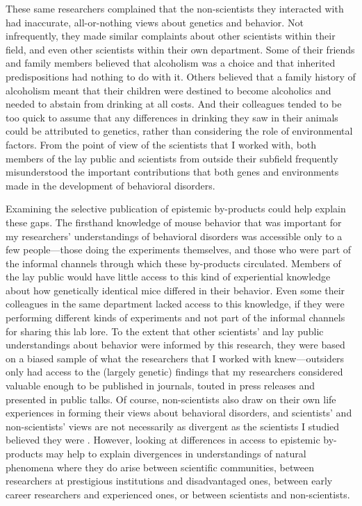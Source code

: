 \documentclass[twocolumn, serif, meta, authordate]{jote-article}
\begin{document}
These same researchers complained that the non-scientists they interacted with had inaccurate, all-or-nothing views about genetics and behavior. Not infrequently, they made similar complaints about other scientists within their field, and even other scientists within their own department. Some of their friends and family members believed that alcoholism was a choice and that inherited predispositions had nothing to do with it. Others believed that a family history of alcoholism meant that their children were destined to become alcoholics and needed to abstain from drinking at all costs. And their colleagues tended to be too quick to assume that any differences in drinking they saw in their animals could be attributed to genetics, rather than considering the role of environmental factors. From the point of view of the scientists that I worked with, both members of the lay public and scientists from outside their subfield frequently misunderstood the important contributions that both genes and environments made in the development of behavioral disorders.

Examining the selective publication of epistemic by-products could help explain these gaps. The firsthand knowledge of mouse behavior that was important for my researchers' understandings of behavioral disorders was accessible only to a few people---those doing the experiments themselves, and those who were part of the informal channels through which these by-products circulated. Members of the lay public would have little access to this kind of experiential knowledge about how genetically identical mice differed in their behavior. Even some their colleagues in the same department lacked access to this knowledge, if they were performing different kinds of experiments and not part of the informal channels for sharing this lab lore. To the extent that other scientists' and lay public understandings about behavior were informed by this research, they were based on a biased sample of what the researchers that I worked with knew---outsiders only had access to the (largely genetic) findings that my researchers considered valuable enough to be published in journals, touted in press releases and presented in public talks. Of course, non-scientists also draw on their own life experiences in forming their views about behavioral disorders, and scientists' and non-scientists' views are not necessarily as divergent as the scientists I studied believed they were \parencite{Richards2006}. However, looking at differences in access to epistemic by-products may help to explain divergences in understandings of natural phenomena where they do arise between scientific communities, between researchers at prestigious institutions and disadvantaged ones, between early career researchers and experienced ones, or between scientists and non-scientists.
\end{document}

